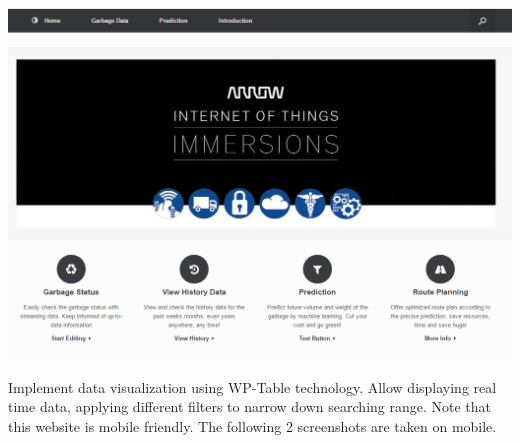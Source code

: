 \documentclass[a0b,portrait]{a0poster}
\begin{document}
\begin{multicols}{3}
\begin{center}
\includegraphics[width=\linewidth]{home.PNG}
\end{center}
Implement data visualization using WP-Table technology. Allow displaying real time data, applying different filters to narrow down searching range. Note that this website is mobile friendly. The following 2 screenshots are taken on mobile.
\begin{center}

\end{center}
\end{multicols}
\end{document}
